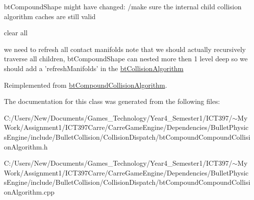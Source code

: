 btCompoundShape might have changed: /make sure the internal child collision algorithm caches are still valid

clear all

we need to refresh all contact manifolds note that we should actually recursively traverse all children, btCompoundShape can nested more then 1 level deep so we should add a 'refreshManifolds' in the \hyperlink{classbt_collision_algorithm}{btCollisionAlgorithm} 

Reimplemented from \hyperlink{classbt_compound_collision_algorithm_173ce993461795e0572dd2924c54cdc0}{btCompoundCollisionAlgorithm}.

The documentation for this class was generated from the following files:\begin{CompactItemize}
\item 
C:/Users/New/Documents/Games\_\-Technology/Year4\_\-Semester1/ICT397/$\sim$My Work/Assignment1/ICT397Carre/CarreGameEngine/Dependencies/BulletPhysicsEngine/include/BulletCollision/CollisionDispatch/btCompoundCompoundCollisionAlgorithm.h\item 
C:/Users/New/Documents/Games\_\-Technology/Year4\_\-Semester1/ICT397/$\sim$My Work/Assignment1/ICT397Carre/CarreGameEngine/Dependencies/BulletPhysicsEngine/include/BulletCollision/CollisionDispatch/btCompoundCompoundCollisionAlgorithm.cpp\end{CompactItemize}
